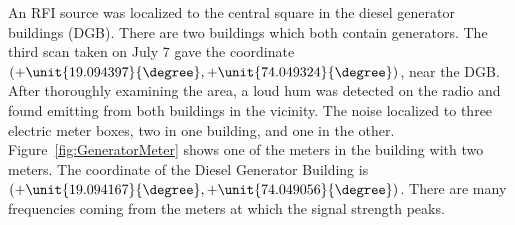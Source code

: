 \documentclass[a4paper,12pt]{article}
\begin{document}
                                                                                                                                                                                                                                                                                                                                                                                                                                                                                                                            An RFI source was localized to the central square in the diesel generator buildings (DGB). There are two buildings which both contain generators. The third scan taken on July 7 gave the coordinate $(+\unit{19.094397}{\degree},+\unit{74.049324}{\degree})$, near the DGB. After thoroughly examining the area, a loud hum was detected on the radio and found emitting from both buildings in the vicinity. The noise localized to three electric meter boxes, two in one building, and one in the other. Figure~\ref{fig:GeneratorMeter} shows one of the meters in the building with two meters. The coordinate of the Diesel Generator Building is  $(+\unit{19.094167}{\degree},+\unit{74.049056}{\degree})$. There are many frequencies coming from the meters at which the signal strength peaks.
\end{document}
